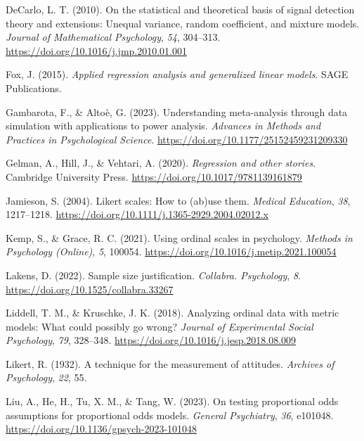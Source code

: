 \documentclass[
  man,floatsintext]{apa6}
\newlength{\cslhangindent}
\newenvironment{CSLReferences}[2] %
 {\begin{list}{}{%
  \setlength{\itemindent}{0pt}
  \setlength{\leftmargin}{0pt}
  \setlength{\parsep}{0pt}
  \ifodd #1
   \setlength{\leftmargin}{\cslhangindent}
   \setlength{\itemindent}{-1\cslhangindent}
  \fi
  \setlength{\itemsep}{#2\baselineskip}}}
 {\end{list}}
\begin{document}
\begin{CSLReferences}{1}{0}
DeCarlo, L. T. (2010). On the statistical and theoretical basis of signal detection theory and extensions: Unequal variance, random coefficient, and mixture models. \emph{Journal of Mathematical Psychology}, \emph{54}, 304--313. \url{https://doi.org/10.1016/j.jmp.2010.01.001}

Fox, J. (2015). \emph{Applied regression analysis and generalized linear models}. SAGE Publications.

Gambarota, F., \& Altoè, G. (2023). Understanding meta-analysis through data simulation with applications to power analysis. \emph{Advances in Methods and Practices in Psychological Science}. \url{https://doi.org/10.1177/25152459231209330}

Gelman, A., Hill, J., \& Vehtari, A. (2020). \emph{Regression and other stories}. Cambridge University Press. \url{https://doi.org/10.1017/9781139161879}

Jamieson, S. (2004). Likert scales: How to (ab)use them. \emph{Medical Education}, \emph{38}, 1217--1218. \url{https://doi.org/10.1111/j.1365-2929.2004.02012.x}

Kemp, S., \& Grace, R. C. (2021). Using ordinal scales in psychology. \emph{Methods in Psychology (Online)}, \emph{5}, 100054. \url{https://doi.org/10.1016/j.metip.2021.100054}

Lakens, D. (2022). Sample size justification. \emph{Collabra. Psychology}, \emph{8}. \url{https://doi.org/10.1525/collabra.33267}

Liddell, T. M., \& Kruschke, J. K. (2018). Analyzing ordinal data with metric models: What could possibly go wrong? \emph{Journal of Experimental Social Psychology}, \emph{79}, 328--348. \url{https://doi.org/10.1016/j.jesp.2018.08.009}

Likert, R. (1932). A technique for the measurement of attitudes. \emph{Archives of Psychology}, \emph{22}, 55.

Liu, A., He, H., Tu, X. M., \& Tang, W. (2023). On testing proportional odds assumptions for proportional odds models. \emph{General Psychiatry}, \emph{36}, e101048. \url{https://doi.org/10.1136/gpsych-2023-101048}


\end{CSLReferences}
\end{document}
